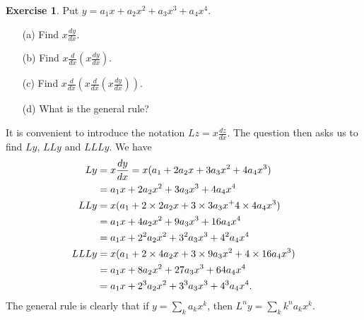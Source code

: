 \documentclass[a4paper]{book}
\theoremstyle{definition}
\newtheorem{exercise}[theorem]{Exercise}
\renewenvironment{solution}{\SolutionInline}{\endSolutionInline}
\begin{document}
\begin{exercise}
 Put $y= a_1x+a_2x^2+a_3x^3+a_4x^4$.
 \begin{itemize}
  \item[(a)] Find $x\frac{dy}{dx}$.
  \item[(b)] Find $x\frac{d}{dx}\left(x\frac{dy}{dx}\right)$.
  \item[(c)] Find
   $x\frac{d}{dx}\left(x\frac{d}{dx}\left(x\frac{dy}{dx}\right)\right)$.
  \item[(d)] What is the general rule?
 \end{itemize}
\end{exercise}
\begin{solution}
 It is convenient to introduce the notation $Lz=x\frac{dz}{dx}$.  The
 question then asks us to find $Ly$, $LLy$ and $LLLy$.  We have
 \begin{align*}
  Ly   &= x\frac{dy}{dx} = x(a_1+2a_2x+3a_3x^2+4a_4x^3) \\
       &= a_1x + 2a_2x^2 + 3a_3x^3 + 4a_4x^4 \\
  LLy  &= x(a_1 + 2\times 2a_2x + 3\times 3a_3x^ + 4\times 4a_4x^3) \\
       &= a_1x + 4a_2x^2 + 9 a_3x^3 + 16a_4x^4 \\
       &= a_1x + 2^2a_2x^2 + 3^2 a_3x^3 + 4^2a_4x^4 \\
  LLLy &= x(a_1 + 2\times 4a_2x + 3\times 9a_3x^2 + 4\times 16a_4x^3) \\
       &= a_1x + 8a_2x^2 + 27 a_3x^3 + 64a_4x^4 \\
       &= a_1x + 2^3a_2x^2 + 3^3 a_3x^3 + 4^3a_4x^4.
 \end{align*}
 The general rule is clearly that if $y=\sum_ka_kx^k$, then
 $L^ny=\sum_kk^na_kx^k$. 
\end{solution}
\end{document}
